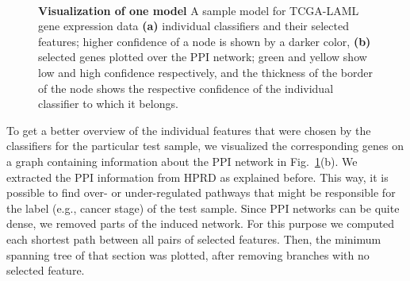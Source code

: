 \begin{figure}[!tpb]
\setlength{\fboxsep}{0pt}%
\setlength{\fboxrule}{0.5pt}%
  \ \ 
  \caption{\textbf{Visualization of one model} A sample model for TCGA-LAML gene expression data \textbf{(a)} individual classifiers and their selected features; higher confidence of a node is shown by a darker color, \textbf{(b)} selected genes plotted over the PPI network; green and yellow show low and high confidence respectively, and the thickness of the border of the node shows the respective confidence of the individual classifier to which it belongs.}
  \label{fig:sample-model}
\end{figure}

To get a better overview of the individual features that were chosen by the classifiers for the particular test sample, we visualized the corresponding genes on a graph containing information about the PPI network in Fig.~\ref{fig:sample-model}(b). We extracted the PPI information from HPRD as explained before. This way, it is possible to find over- or under-regulated pathways that might be responsible for the label (e.g., cancer stage) of the test sample. Since PPI networks can be quite dense, we removed parts of the induced network. For this purpose we computed each shortest path between all pairs of selected features. Then, the minimum spanning tree of that section was plotted, after removing branches with no selected feature.

